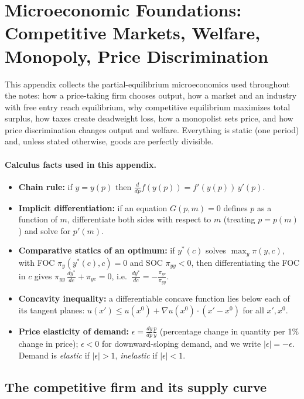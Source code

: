 \section[Microeconomic Foundations: Competitive Markets, Welfare, Monopoly, Price Discrimination]{Microeconomic Foundations: Competitive Markets, Welfare,\\ Monopoly, Price Discrimination}

This appendix collects the partial-equilibrium microeconomics used throughout the notes: how a price-taking firm chooses output, how a market and an industry with free entry reach equilibrium, why competitive equilibrium maximizes total surplus, how taxes create deadweight loss, how a monopolist sets price, and how price discrimination changes output and welfare. Everything is static (one period) and, unless stated otherwise, goods are perfectly divisible.

\paragraph{Calculus facts used in this appendix.}
\begin{itemize}
\item \textbf{Chain rule:} if $y=y(p)$ then $\frac{d}{dp}f(y(p))=f'(y(p))\,y'(p)$.
\item \textbf{Implicit differentiation:} if an equation $G(p,m)=0$ defines $p$ as a function of $m$, differentiate both sides with respect to $m$ (treating $p=p(m)$) and solve for $p'(m)$.
\item \textbf{Comparative statics of an optimum:} if $y^*(c)$ solves $\max_y \pi(y,c)$, with FOC $\pi_y(y^*(c),c)=0$ and SOC $\pi_{yy}<0$, then differentiating the FOC in $c$ gives $\pi_{yy}\,\frac{dy^*}{dc}+\pi_{yc}=0$, i.e.\ $\frac{dy^*}{dc}=-\frac{\pi_{yc}}{\pi_{yy}}$.
\item \textbf{Concavity inequality:} a differentiable concave function lies below each of its tangent planes: $u(x')\le u(x^0)+\nabla u(x^0)\cdot(x'-x^0)$ for all $x',x^0$.
\item \textbf{Price elasticity of demand:} $\epsilon=\frac{dy}{dp}\frac{p}{y}$ (percentage change in quantity per 1\% change in price); $\epsilon<0$ for downward-sloping demand, and we write $|\epsilon|=-\epsilon$. Demand is \emph{elastic} if $|\epsilon|>1$, \emph{inelastic} if $|\epsilon|<1$.
\end{itemize}

\subsection{The competitive firm and its supply curve }

